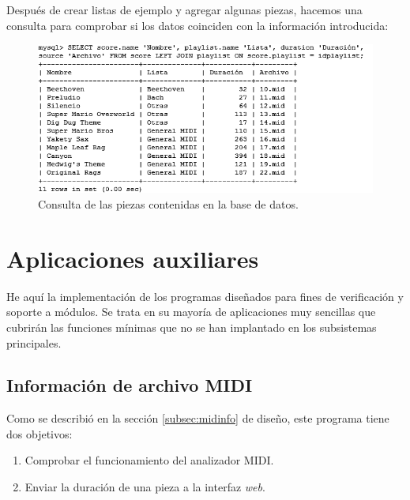 \smallskip

Después de crear listas de ejemplo y agregar algunas piezas, hacemos una consulta para comprobar si los datos coinciden con la información introducida:

\smallskip

\begin{figure}[H]
	\noindent \begin{centering}
		\includegraphics[width=\linewidth*3/4]{capitulo5/cap_sql}
		\par\end{centering}
	\smallskip
	\caption{\label{fig:cap_sql} Consulta de las piezas contenidas en la base de datos.}
\end{figure} 

\smallskip

\section{Aplicaciones auxiliares}

He aquí la implementación de los programas diseñados para fines de verificación y soporte a módulos. Se trata en su mayoría de aplicaciones muy sencillas que cubrirán las funciones mínimas que no se han implantado en los subsistemas principales.

\subsection{Información de archivo MIDI}

Como se describió en la sección \ref{subsec:midinfo} de diseño, este programa tiene dos objetivos:

\begin{enumerate}
	\item Comprobar el funcionamiento del analizador \acrshort{MIDI}.
	\item Enviar la duración de una pieza a la interfaz \textit{web}.
\end{enumerate}

